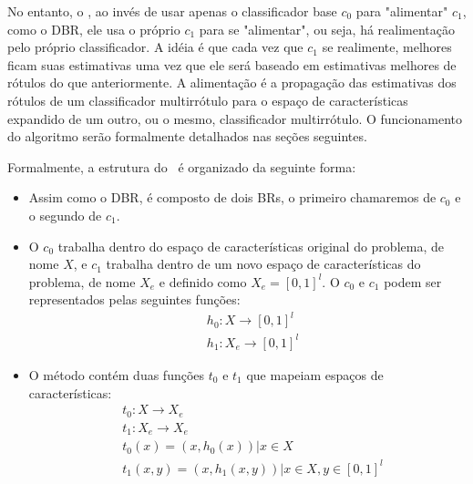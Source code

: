 No entanto, o \MRLMa, ao invés de usar apenas o classificador base $c_0$ para "alimentar" $c_1$, como o DBR,
ele usa o próprio $c_1$ para se "alimentar", ou seja, há realimentação pelo próprio classificador.
A idéia é que cada vez que $c_1$ se realimente, melhores ficam suas estimativas uma vez que ele será baseado
em estimativas melhores de rótulos do que anteriormente. 
A alimentação é a propagação das 
estimativas dos rótulos de um classificador multirrótulo para o espaço de características expandido de um outro, ou o mesmo,
classificador multirrótulo. O funcionamento do algoritmo serão formalmente detalhados nas seções seguintes.

Formalmente, a estrutura do \MRLMa~é organizado da seguinte forma:
\begin{itemize}
  \item Assim como o DBR, é composto de dois BRs, o primeiro chamaremos de $c_0$ e o segundo de $c_1$. 

  \item O $c_0$ trabalha dentro do espaço de características original do problema, de nome $X$,
  e $c_1$ trabalha dentro de um novo espaço de características do problema, de nome $X_e$ e
   definido como $X_e=[0,1]^{l}$. O $c_0$ e $c_1$ podem ser
  representados pelas seguintes funções:
  \begin{equation}
  \begin{split}
   & h_0 : X \rightarrow [0,1]^l \\
   & h_1 : X_e \rightarrow [0,1]^l
   \end{split}
  \end{equation}
  \item O método contém duas funções $t_0$ e $t_1$ que mapeiam espaços de características:
   \begin{equation}
 \begin{split}
    & t_0 : X \rightarrow X_e \\
    & t_1 : X_e \rightarrow X_e \\
    & t_0(x)=(x,h_0(x)) | x \in X \\
    & t_1(x,y)=(x,h_1(x,y)) | x \in X,  y \in [0,1]^{l}
  \end{split}
 \end{equation}
  
\end{itemize}

